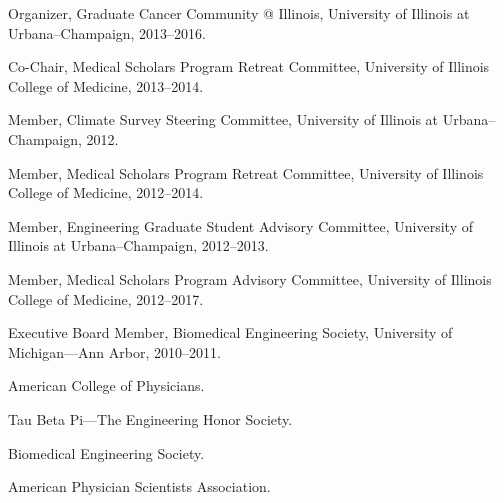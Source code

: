\documentclass[11pt,article,oneside]{memoir}
\begin{document}
\ind Organizer, Graduate Cancer Community @ Illinois, University of Illinois at Urbana--Champaign, 2013--2016.

\ind Co-Chair, Medical Scholars Program Retreat Committee, University of Illinois College of Medicine, 2013--2014.

\ind Member, Climate Survey Steering Committee, University of Illinois at Urbana--Champaign, 2012.

\ind Member, Medical Scholars Program Retreat Committee, University of Illinois College of Medicine, 2012--2014.

\ind Member, Engineering Graduate Student Advisory Committee, University of Illinois at Urbana--Champaign, 2012--2013.

\ind Member, Medical Scholars Program Advisory Committee, University of Illinois College of Medicine, 2012--2017.

\ind Executive Board Member, Biomedical Engineering Society, University of Michigan---Ann Arbor, 2010--2011.

\bigskip


\ind American College of Physicians.

\ind Tau Beta Pi---The Engineering Honor Society.

\ind Biomedical Engineering Society.

\ind American Physician Scientists Association.
\end{document}
